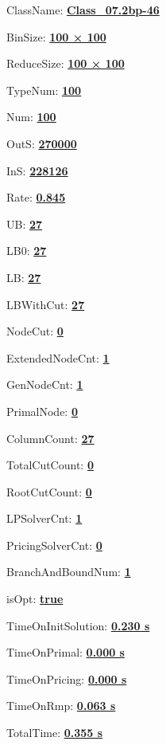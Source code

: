 \documentclass[11pt]{article}
\begin{document}
\pagestyle{empty}


ClassName: \underline{\textbf{Class_07.2bp-46}}
\par
BinSize: \underline{\textbf{100 × 100}}
\par
ReduceSize: \underline{\textbf{100 × 100}}
\par
TypeNum: \underline{\textbf{100}}
\par
Num: \underline{\textbf{100}}
\par
OutS: \underline{\textbf{270000}}
\par
InS: \underline{\textbf{228126}}
\par
Rate: \underline{\textbf{0.845}}
\par
UB: \underline{\textbf{27}}
\par
LB0: \underline{\textbf{27}}
\par
LB: \underline{\textbf{27}}
\par
LBWithCut: \underline{\textbf{27}}
\par
NodeCut: \underline{\textbf{0}}
\par
ExtendedNodeCnt: \underline{\textbf{1}}
\par
GenNodeCnt: \underline{\textbf{1}}
\par
PrimalNode: \underline{\textbf{0}}
\par
ColumnCount: \underline{\textbf{27}}
\par
TotalCutCount: \underline{\textbf{0}}
\par
RootCutCount: \underline{\textbf{0}}
\par
LPSolverCnt: \underline{\textbf{1}}
\par
PricingSolverCnt: \underline{\textbf{0}}
\par
BranchAndBoundNum: \underline{\textbf{1}}
\par
isOpt: \underline{\textbf{true}}
\par
TimeOnInitSolution: \underline{\textbf{0.230 s}}
\par
TimeOnPrimal: \underline{\textbf{0.000 s}}
\par
TimeOnPricing: \underline{\textbf{0.000 s}}
\par
TimeOnRmp: \underline{\textbf{0.063 s}}
\par
TotalTime: \underline{\textbf{0.355 s}}
\par
\newpage


\end{document}
